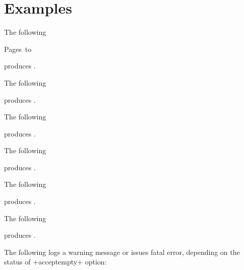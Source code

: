 \documentclass[10pt,a4paper]{article}
\begin{document}
\section{Examples}
\pgexample{}
The following

\begin{pverbatim}
Pages~\pagestart\space to\space\pageend
\end{pverbatim}

produces .

\pgexample{}

The following

\begin{pverbatim}
\end{pverbatim}

produces .

\pgexample{}
The following

\begin{pverbatim}
\end{pverbatim}

produces .

\pgexample{}
The following

\begin{pverbatim}
\end{pverbatim}

produces .

\pgexample{}
The following

\begin{pverbatim}
\end{pverbatim}

produces .

The following

\begin{pverbatim}
\pagerange{-}
\end{pverbatim}

\pagerange{-}
\par\medskip\noindent
produces .

\pgexample{}
The following logs a warning message or issues fatal error, depending on the status of +acceptempty+ option:
\end{document}
